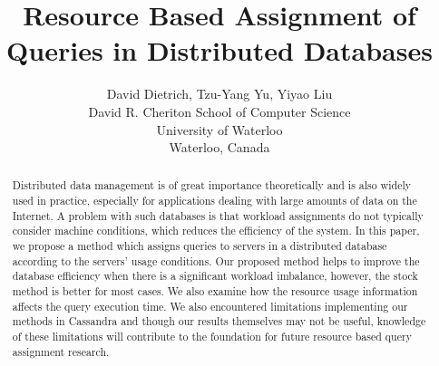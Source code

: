 \documentclass[]{acm_proc_article-sp}
\begin{document}
\title{Resource Based Assignment of Queries in Distributed Databases}

\author{
  David Dietrich, Tzu-Yang Yu, Yiyao Liu \\
  David R. Cheriton School of Computer Science \\
  University of Waterloo \\
  Waterloo, Canada \\
}

\maketitle


\begin{abstract}
Distributed data management is of great importance theoretically and is also widely used in practice, especially for applications dealing with large amounts of data on the Internet. A problem with such databases is that workload assignments do not typically consider machine conditions, which reduces the efficiency of the system. In this paper, we propose a method which assigns queries to servers in a distributed database according to the servers' usage conditions. Our proposed method helps to improve the database efficiency when there is a significant workload imbalance, however, the stock method is better for most cases. We also examine how the resource usage information affects the query execution time. We also encountered limitations implementing our methods in Cassandra and though our results themselves may not be useful, knowledge of these limitations will contribute to the foundation for future resource based query assignment research.
\end{abstract}











\end{document}

